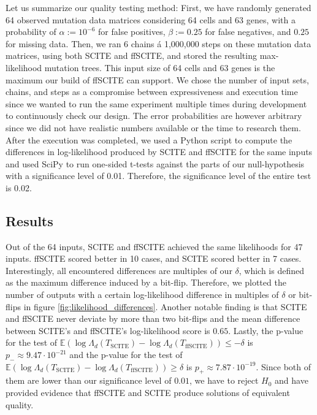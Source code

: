 Let us summarize our quality testing method: First, we have randomly generated 64 observed mutation data matrices considering 64 cells and 63 genes, with a probability of $\alpha := 10^{-6}$ for false positives, $\beta := 0.25$ for false negatives, and $0.25$ for missing data. Then, we ran 6 chains á 1,000,000 steps on these mutation data matrices, using both \ac{SCITE} and \ac{ffSCITE}, and stored the resulting max-likelihood mutation trees. This input size of 64 cells and 63 genes is the maximum our build of \ac{ffSCITE} can support. We chose the number of input sets, chains, and steps as a compromise between expressiveness and execution time since we wanted to run the same experiment multiple times during development to continuously check our design. The error probabilities are however arbitrary since we did not have realistic numbers available or the time to research them. After the execution was completed, we used a Python script to compute the differences in log-likelihood produced by \ac{SCITE} and \ac{ffSCITE} for the same inputs and used SciPy to run one-sided t-tests against the parts of our null-hypothesis with a significance level of 0.01. Therefore, the significance level of the entire test is 0.02.

\subsection{Results}

Out of the 64 inputs, \ac{SCITE} and \ac{ffSCITE} achieved the same likelihoods for 47 inputs. \ac{ffSCITE} scored better in 10 cases, and \ac{SCITE} scored better in 7 cases. Interestingly, all encountered differences are multiples of our $\delta$, which is defined as the maximum difference induced by a bit-flip. Therefore, we plotted the number of outputs with a certain log-likelihood difference in multiples of $\delta$ or bit-flips in figure \ref{fig:likelihood_differences}. Another notable finding is that \ac{SCITE} and \ac{ffSCITE} never deviate by more than two bit-flips and the mean difference between \ac{SCITE}'s and \ac{ffSCITE}'s log-likelihood score is $0.65$. Lastly, the p-value for the test of $\mathbb{E} \left(\log\Lambda_d(T_\mathrm{SCITE}) - \log\Lambda_d(T_\mathrm{ffSCITE})\right) \leq - \delta$ is $p_- \approx 9.47 \cdot 10^{-21}$ and the p-value for the test of $\mathbb{E} \left(\log\Lambda_d(T_\mathrm{SCITE}) - \log\Lambda_d(T_\mathrm{ffSCITE})\right) \geq \delta$ is $p_+ \approx 7.87 \cdot 10^{-19}$. Since both of them are lower than our significance level of $0.01$, we have to reject $H_0$ and have provided evidence that \ac{ffSCITE} and \ac{SCITE} produce solutions of equivalent quality.

